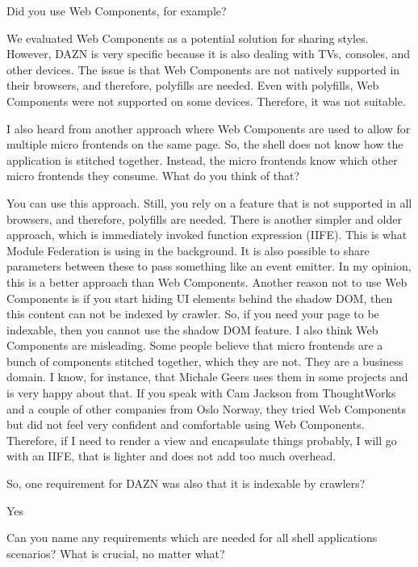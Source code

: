 \begin{description}
    \NicoVogel Did you use Web Components, for example?

    \LucaMezzalira We evaluated Web Components as a potential solution for sharing styles. However, DAZN is very specific because it is also dealing with TVs, consoles, and other devices. The issue is that Web Components are not natively supported in their browsers, and therefore, polyfills are needed. Even with polyfills, Web Components were not supported on some devices. Therefore, it was not suitable.

    \NicoVogel I also heard from another approach where Web Components are used to allow for multiple micro frontends on the same page. So, the shell does not know how the application is stitched together. Instead, the micro frontends know which other micro frontends they consume. What do you think of that?

    \LucaMezzalira You can use this approach. Still, you rely on a feature that is not supported in all browsers, and therefore, polyfills are needed. There is another simpler and older approach, which is immediately invoked function expression (IIFE). This is what Module Federation is using in the background. It is also possible to share parameters between these to pass something like an event emitter. In my opinion, this is a better approach than Web Components. Another reason not to use Web Components is if you start hiding UI elements behind the shadow DOM, then this content can not be indexed by crawler. So, if you need your page to be indexable, then you cannot use the shadow DOM feature.
    I also think Web Components are misleading. Some people believe that micro frontends are a bunch of components stitched together, which they are not. They are a business domain. I know, for instance, that Michale Geers uses them in some projects and is very happy about that. If you speak with Cam Jackson from ThoughtWorks and a couple of other companies from Oslo Norway, they tried Web Components but did not feel very confident and comfortable using Web Components. Therefore, if I need to render a view and encapsulate things probably, I will go with an IIFE, that is lighter and does not add too much overhead.

    \NicoVogel So, one requirement for DAZN was also that it is indexable by crawlers?

    \LucaMezzalira Yes

    \NicoVogel Can you name any requirements which are needed for all shell applications scenarios? What is crucial, no matter what?


\end{description}
